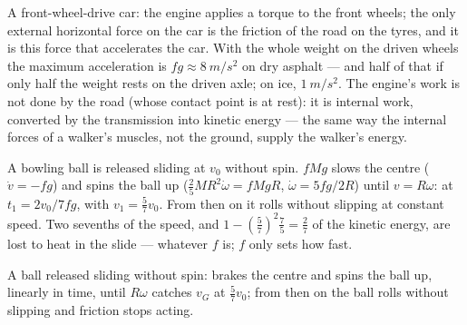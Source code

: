 \begin{example}\label{ex:b2:rigid-body-mechanics:car}
A front-wheel-drive car: the engine applies a torque to the front
wheels; the only external horizontal force on the car is the friction
of the road on the tyres, and it is this force that accelerates the
car. With the whole weight on the driven wheels the maximum acceleration
is $fg \approx \qty{8}{m/s^2}$ on dry asphalt --- and half of that if only
half the weight rests on the driven axle; on ice, $\qty{1}{m/s^2}$. The
engine's work is not done by the road (whose contact point is at rest):
it is internal work, converted by the transmission into kinetic energy
--- the same way the internal forces of a walker's muscles, not the
ground, supply the walker's energy.
\end{example}

\begin{example}\label{ex:b2:rigid-body-mechanics:bowling}
A bowling ball is released sliding at $v_0$ without spin.  $fMg$ slows the centre ($\dot v = -fg$) and spins the ball up
($\tfrac25MR^2\dot\omega = fMgR$, $\dot\omega = 5fg/2R$) until $v = R\omega$:
at $t_1 = 2v_0/7fg$, with $v_1 = \tfrac57v_0$. From then on it rolls
without slipping at constant speed. Two sevenths of the speed, and
$1 - (\tfrac57)^2\tfrac75 = \tfrac27$ of the kinetic energy, are lost to heat
in the slide --- whatever $f$ is; $f$ only sets how fast.
\end{example}

\begin{omfigure}

{\small A ball released sliding without spin:  brakes
the centre and spins the ball up, linearly in time, until $R\omega$
catches $v_G$ at $\tfrac57v_0$; from then on the ball rolls without
slipping and friction stops acting.}
\end{omfigure}


